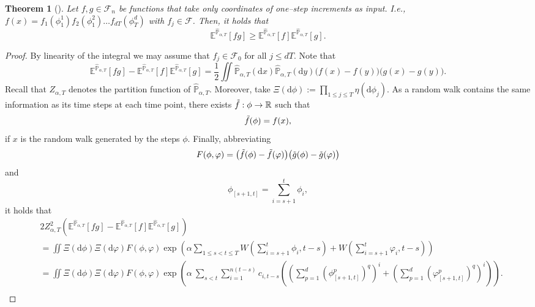 \documentclass[reqno,11pt]{amsart}
\newcommand{\1}{\mathds{1}}
\theoremstyle{plain}
\newtheorem{theorem}{Theorem}[section]
\theoremstyle{definition}
\numberwithin{equation}{section}
\newcommand{\nn}{\nonumber}
\newcommand{\caF}{{\mathcal F}}
\newcommand{\bbE}{{\mathbb E}}
\newcommand{\bbP}{{\mathbb P}}
\newcommand{\bbR}{{\mathbb R}}
\newcommand{\de}{{\mathrm{d}}}
\newcommand{\bbPh}{\hat{\bbP}}
\def\lt{\left}
\def\rt{\right}
\begin{document}
\begin{theorem}[{\cite[Theorem 7.1]{simon79}}]
    \label{thm:gks}
    Let $f,g \in \caF_n$ be functions that take only coordinates of one--step increments as input. I.e., 
    $f(x) = f_1 (\phi_1 ^1) f_2 (\phi_1 ^2) \dots f_{dT}(\phi_T ^d)$ with $f_j \in \caF$.
    Then, it holds that
    $$\bbE^{\bbPh_{\alpha,T}}[f g]  \ge \bbE^{\bbPh_{\alpha,T}}[ f] \bbE^{\bbPh_{\alpha,T}}[g].$$
\end{theorem}

\begin{proof}
    By linearity of the integral we may assume that $f_j \in \caF_0$ for all $j \le dT$. Note that 
    $$\bbE^{\bbPh_{\alpha,T}}[f g]  - \bbE^{\bbPh_{\alpha,T}}[ f] \bbE^{\bbPh_{\alpha,T}}[g] = \frac 1 2 \iint \bbPh_{\alpha,T}(\de x)\bbPh_{\alpha,T}(\de y) \big(f(x) - f(y)\big) \big(g(x) - g(y)\big).$$
    Recall that $Z_{\alpha,T}$ denotes the partition function of $\bbPh_{\alpha,T}$. Moreover, take $\Xi(\de \phi) := \prod_{1\le j \le T} \eta (\de \phi_j)$. As a random walk contains the same information as its time steps at each time point, there exists $\Tilde{f}: \phi \rightarrow \bbR$ such that
    $$\Tilde{f}(\phi) = f(x),$$
    if $x$ is the random walk generated by the steps $\phi$. Finally, abbreviating
    $$F(\phi, \varphi) = \big(\Tilde{f}(\phi ) - \Tilde{f}(\varphi)\big) \big(\Tilde{g}(\phi) - \Tilde{g}(\varphi)\big)$$ 
    and
    $$\phi_{[s+1,t]} =\sum\limits_{i=s+1} ^t \phi_i,$$
    it holds that 
    \begin{equation}
        \nn
        \begin{split}
           & 2 Z_{\alpha,T} ^2 \lt( \bbE^{\bbPh_{\alpha,T}}[f g]  - \bbE^{\bbPh_{\alpha,T}}[ f] \bbE^{\bbPh_{\alpha,T}}[g] \rt) \\
           &= \iint \Xi \lt(\de \phi \rt) \Xi \lt(\de \varphi \rt) F(\phi, \varphi)  \exp \lt( \alpha \!\!\!\! \sum\limits_{1 \le s< t \le T} \!\!\! W \lt( \sum\limits_{i = s+1} ^t \phi_i , t-s  \rt) 
           \!+ \!W \lt( \sum\limits_{i = s+1} ^t \varphi _i , t-s  \rt)\!\rt) \\
           &= \iint \Xi \lt(\de \phi \rt) \Xi \lt(\de \varphi \rt) F(\phi, \varphi) \exp \lt( \! \alpha \!\!\ \sum\limits_{s < t } \!\!\!\sum\limits_{i=1} ^{n(t-s)}\!\! c_{i,t-s} \!\!\lt( \!\! \lt( \sum\limits_{p=1} ^d (\phi_{[s+1,t]}^p)^q \rt)^i \!\!\!+ \!\! \lt( \sum\limits_{p=1} ^d (\varphi_{[s+1,t]}^p)^q \!\!\rt)^i \rt)\!\!  \rt). \\
        \end{split}
    \end{equation}

\end{proof}
\end{document}
